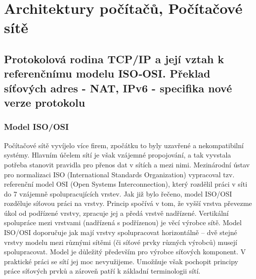 \section{Architektury počítačů, Počítačové sítě}
\subsection[TCP/IP, ISO/OSI, NAT]{Protokolová rodina TCP/IP a její vztah k referenčnímu modelu ISO‐OSI. Překlad síťových adres - NAT, IPv6 - specifika nové verze protokolu}

\subsubsection{Model ISO/OSI}
Počítačové sítě vyvíjelo více firem, zpočátku to byly uzavřené a nekompatibilní systémy. Hlavním účelem sítí je však vzájemné propojování, a tak vyvstala potřeba stanovit pravidla pro přenos dat v sítích a mezi nimi. Mezinárodní ústav pro normalizaci ISO (International Standards Organization) vypracoval tzv. referenční model OSI (Open Systems Interconnection), který rozdělil práci v síti do 7 vzájemně spolupracujících vrstev.
Jak již bylo řečeno, model ISO/OSI rozděluje síťovou práci na vrstvy. Princip spočívá v tom, že vyšší vrstva převezme úkol od podřízené vrstvy, zpracuje jej a předá vrstvě nadřízené. Vertikální spolupráce mezi vrstvami (nadřízená s podřízenou) je věcí výrobce sítě. Model ISO/OSI doporučuje jak mají vrstvy spolupracovat horizontálně – dvě stejné vrstvy modelu mezi různými sítěmi (či síťové prvky různých výrobců) musejí spolupracovat.
Model je důležitý především pro výrobce síťových komponent. V praktické práci se sítí jej moc nevyužijeme. Umožňuje však pochopit principy práce síťových prvků a zároveň patří k základní terminologii sítí.

